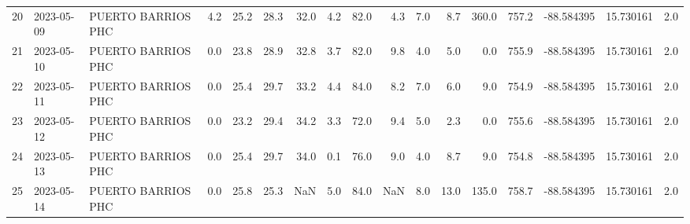 \documentclass[12pt]{article}
\begin{document}
\begin{center}
\begin{tabular}{lllrrrrrrrrrrrrrr}
20  & 2023-05-09 &  PUERTO BARRIOS PHC &     4.2 &  25.2 &   28.3 &  32.0 &      4.2 &     82.0 &        4.3 &  7.0 &         8.7 &       360.0 &      757.2 & -88.584395 &  15.730161 &      2.0 \\
21  & 2023-05-10 &  PUERTO BARRIOS PHC &     0.0 &  23.8 &   28.9 &  32.8 &      3.7 &     82.0 &        9.8 &  4.0 &         5.0 &         0.0 &      755.9 & -88.584395 &  15.730161 &      2.0 \\
22  & 2023-05-11 &  PUERTO BARRIOS PHC &     0.0 &  25.4 &   29.7 &  33.2 &      4.4 &     84.0 &        8.2 &  7.0 &         6.0 &         9.0 &      754.9 & -88.584395 &  15.730161 &      2.0 \\
23  & 2023-05-12 &  PUERTO BARRIOS PHC &     0.0 &  23.2 &   29.4 &  34.2 &      3.3 &     72.0 &        9.4 &  5.0 &         2.3 &         0.0 &      755.6 & -88.584395 &  15.730161 &      2.0 \\
24  & 2023-05-13 &  PUERTO BARRIOS PHC &     0.0 &  25.4 &   29.7 &  34.0 &      0.1 &     76.0 &        9.0 &  4.0 &         8.7 &         9.0 &      754.8 & -88.584395 &  15.730161 &      2.0 \\
25  & 2023-05-14 &  PUERTO BARRIOS PHC &     0.0 &  25.8 &   25.3 &   NaN &      5.0 &     84.0 &        NaN &  8.0 &        13.0 &       135.0 &      758.7 & -88.584395 &  15.730161 &      2.0 \\
\bottomrule
\end{tabular}

        
        \end{center}
        
\end{document}
